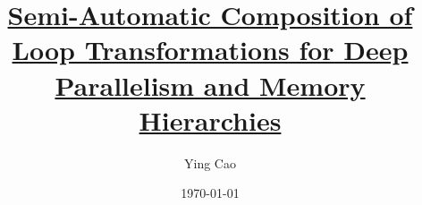 \documentclass {article}
\title{\href{https://link.springer.com/content/pdf/10.1007/s10766-006-0012-3.pdf}{Semi-Automatic Composition of Loop Transformations for Deep Parallelism and Memory Hierarchies}}
\author{Ying Cao}
\date{\today}
\begin{document}
\maketitle
\tableofcontents
\newpage



{
\small
\raggedright

\begin{spacing}{1}

\end{spacing}
}
\end{document}
